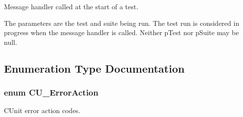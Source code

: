 Message handler called at the start of a test. 

The parameters are the test and suite being run. The test run is considered in progress when the message handler is called. Neither p\+Test nor p\+Suite may be null. 

\subsection{Enumeration Type Documentation}
\hypertarget{group___framework_ga50053b4edbfc96a88027dd57c580ca35}{
\subsubsection[{C\+U\+\_\+\+Error\+Action}]{\setlength{\rightskip}{0pt plus 5cm}enum {\bf C\+U\+\_\+\+Error\+Action}}}\label{group___framework_ga50053b4edbfc96a88027dd57c580ca35}


C\+Unit error action codes. 

